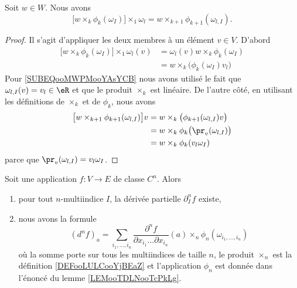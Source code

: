 \begin{lemma}       \label{LEMooLTYCooAoMJKD}
    Soit \( w\in W\). Nous avons
    \begin{equation}
        \big[ w\times_k\phi_k(\omega_I) \big]\times_1\omega_l=w\times_{k+1}\phi_{k+1}(\omega_{l,I}).
    \end{equation}
\end{lemma}

\begin{proof}
    Il s'agit d'appliquer les deux membres à un élément \( v\in V\). D'abord
    \begin{subequations}
        \begin{align}
            \big[ w\times_k\phi_k(\omega_I) \big]\times_1\omega_l(v)&=\omega_l(v)w\times_k\phi_k(\omega_I)\\
            &=w\times_k\big( \phi_k(\omega_I)v_l \big)      \label{SUBEQooMWPMooYAsYCB}
        \end{align}
    \end{subequations}
    Pour \eqref{SUBEQooMWPMooYAsYCB} nous avons utilisé le fait que \( \omega_{l,I}(v)=v_l\in\eR\) et que le produit \( \times_k\) est linéaire. De l'autre côté, en utilisant les définitions de \( \times_{k}\) et de \( \phi_k\), nous avons
    \begin{subequations}
        \begin{align}
            \big[ w\times_{k+1}\phi_{k+1}(\omega_{l,I}) \big]v&=w\times_k\big( \phi_{k+1}(\omega_{l,I})v \big)\\
            &=w\times_k\phi_k\big( \pr_v(\omega_{l,I}) \big)\\
            &=w\times_k\phi_k(v_l\omega_I)
        \end{align}
    \end{subequations}
    parce que \( \pr_v(\omega_{l,I})=v_l\omega_I\).
\end{proof}

\begin{proposition}      \label{PROPooVGRRooHSwcPl}
    Soit une application \( f\colon V\to E\) de classe \( C^n\). Alors
    \begin{enumerate}
        \item
            pour tout \( n\)-multiindice \( I\), la dérivée partielle \( \partial^n_If\) existe,
        \item
            nous avons la formule
            \begin{equation}
                (d^nf)_a=\sum_{i_1,\ldots, i_n}\frac{ \partial^nf }{ \partial x_{i_1}\ldots \partial x_{i_n} }(a)\times_n\phi_n(\omega_{i_1,\ldots, i_n})
            \end{equation}
            où la somme porte sur tous les multiindices de taille \( n\), le produit \( \times_n\) est la définition \ref{DEFooLULCooYjBEaZ} et l'application \( \phi_n\) est donnée dans l'énoncé du lemme \ref{LEMooTDLNooTcPkLg}.
    \end{enumerate}
\end{proposition}

